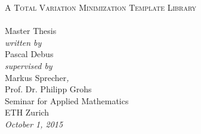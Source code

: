 \begin{titlepage}
\begin{center}
  \hfill
  \vspace{3.0cm}

  {\huge \textsc{A Total Variation Minimization Template Library\\[10pt]
  }}
  ~\\[20pt]

  {\huge{Master Thesis}}\\[2.5cm]

  {\emph{written by}}\\
  Pascal Debus
  \\[0.6cm]
  {\emph{supervised by}}\\
  Markus Sprecher{\emph{,}}\\
  Prof. Dr. Philipp Grohs\\

  Seminar for Applied Mathematics\\
  ETH Zurich
  \\[0.5cm]
  \emph{{October 1, 2015}}
\end{center}
\end{titlepage}

